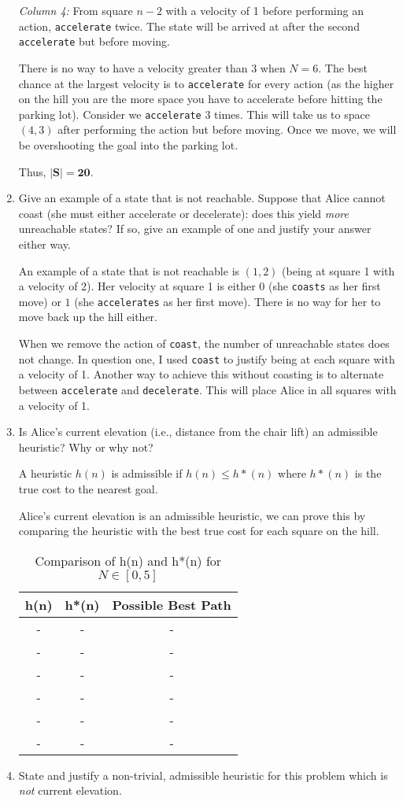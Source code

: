 \documentclass[fleqn]{hermans-hw}
\begin{document}
\begin{enumerate}
\textit{Column 4:} From square $n - 2$ with a velocity of 1 before performing an action, \texttt{accelerate} twice. The state will be arrived at after the second \texttt{accelerate} but before moving.

There is no way to have a velocity greater than $3$ when $N = 6$. The best chance at the largest velocity is to \texttt{accelerate} for every action (as the higher on the hill you are the more space you have to accelerate before hitting the parking lot). Consider we \texttt{accelerate} 3 times. This will take us to space $(4, 3)$ after performing the action but before moving. Once we move, we will be overshooting the goal into the parking lot.

Thus, $\mathbf{|S| = 20}$.

\item Give an example of a state that is not reachable.  Suppose that
Alice cannot coast (she must either accelerate or decelerate): does this
yield \emph{more} unreachable states? If so, give an example of one and
justify your answer either way.

An example of a state that is not reachable is $(1, 2)$ (being at square 1 with a velocity of 2). Her velocity at square 1 is either $0$ (she \texttt{coasts} as her first move) or $1$ (she \texttt{accelerates} as her first move). There is no way for her to move back up the hill either.

When we remove the action of \texttt{coast}, the number of unreachable states does not change. In question one, I used \texttt{coast} to justify being at each square with a velocity of 1. Another way to achieve this without coasting is to alternate between \texttt{accelerate} and \texttt{decelerate}. This will place Alice in all squares with a velocity of 1.

\item Is Alice's current elevation (i.e., distance from the chair lift)
an admissible heuristic?  Why or why not?

A heuristic $h(n)$ is admissible if $h(n) \leq h*(n)$ where $h*(n)$ is the true cost to the nearest goal.

Alice's current elevation is an admissible heuristic, we can prove this by comparing the heuristic with the best true cost for each square on the hill.

\begin{table}[H]
\centering
{\renewcommand{\arraystretch}{1.2}%
\begin{tabular}{| c | c | c |}
\hline
\textbf{h(n)} & \textbf{h*(n)} & \textbf{Possible Best Path}\\
\hline
- & - & -\\ \hline
- & - & -\\ \hline
- & - & -\\ \hline
- & - & -\\ \hline
- & - & -\\ \hline
- & - & -\\ \hline
\end{tabular}}
\caption{Comparison of h(n) and h*(n) for $N \in [0, 5]$}
\end{table}


\item State and justify a non-trivial, admissible heuristic for this
problem which is \emph{not} current elevation.
\end{enumerate}
\end{document}
